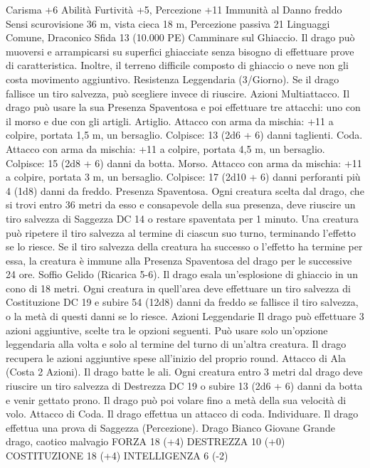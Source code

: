 \begin{multicols}{2}
Carisma +6
Abilità Furtività +5, Percezione +11
Immunità al Danno freddo
Sensi scurovisione 36 m, vista cieca 18 m, Percezione passiva 21
Linguaggi Comune, Draconico
Sfida 13 (10.000 PE)
Camminare sul Ghiaccio. Il drago può muoversi e arrampicarsi su
superfici ghiacciate senza bisogno di effettuare prove di
caratteristica. Inoltre, il terreno difficile composto di ghiaccio o neve
non gli costa movimento aggiuntivo.
Resistenza Leggendaria (3/Giorno). Se il drago fallisce un tiro
salvezza, può scegliere invece di riuscire.
Azioni
Multiattacco. Il drago può usare la sua Presenza Spaventosa e
poi effettuare tre attacchi: uno con il morso e due con gli artigli.
Artiglio. Attacco con arma da mischia: +11 a colpire, portata 1,5
m, un bersaglio.
Colpisce: 13 (2d6 + 6) danni taglienti.
Coda. Attacco con arma da mischia: +11 a colpire, portata 4,5
m, un bersaglio.
Colpisce: 15 (2d8 + 6) danni da botta.
Morso. Attacco con arma da mischia: +11 a colpire, portata 3 m,
un bersaglio.
Colpisce: 17 (2d10 + 6) danni perforanti più 4 (1d8) danni da freddo.
Presenza Spaventosa. Ogni creatura scelta dal drago, che si trovi
entro 36 metri da esso e consapevole della sua presenza, deve
riuscire un tiro salvezza di Saggezza DC 14 o restare spaventata per
1 minuto. Una creatura può ripetere il tiro salvezza al termine di
ciascun suo turno, terminando l’effetto se lo riesce. Se il tiro salvezza
della creatura ha successo o l’effetto ha termine per essa, la creatura è
immune alla Presenza Spaventosa del drago per le successive 24 ore.
Soffio Gelido (Ricarica 5-6). Il drago esala un’esplosione di
ghiaccio in un cono di 18 metri. Ogni creatura in quell’area deve
effettuare un tiro salvezza di Costituzione DC 19 e subire 54
(12d8) danni da freddo se fallisce il tiro salvezza, o la metà di
questi danni se lo riesce.
Azioni Leggendarie
Il drago può effettuare 3 azioni aggiuntive, scelte tra le opzioni
seguenti. Può usare solo un’opzione leggendaria alla volta e solo
al termine del turno di un’altra creatura. Il drago recupera le
azioni aggiuntive spese all’inizio del proprio round.
Attacco di Ala (Costa 2 Azioni). Il drago batte le ali. Ogni creatura
entro 3 metri dal drago deve riuscire un tiro salvezza di Destrezza
DC 19 o subire 13 (2d6 + 6) danni da botta e venir gettato prono.
Il drago può poi volare fino a metà della sua velocità di volo.
Attacco di Coda. Il drago effettua un attacco di coda.
Individuare. Il drago effettua una prova di Saggezza (Percezione).
Drago Bianco Giovane
Grande drago, caotico malvagio
FORZA 18 (+4)
DESTREZZA 10 (+0)
COSTITUZIONE 18 (+4)
INTELLIGENZA 6 (-2)

\end{multicols}
